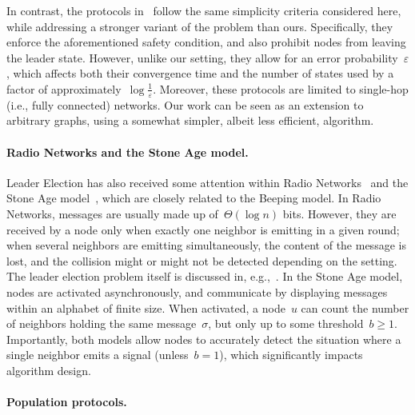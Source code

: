 \documentclass{article}
\begin{document}
In contrast, the protocols in~\cite{gilbert_computational_2015} follow the same simplicity criteria considered here, while addressing a stronger variant of the problem than ours. Specifically, they enforce the aforementioned safety condition, and also prohibit nodes from leaving the leader state. However, unlike our setting, they allow for an error probability~$\varepsilon$, which affects both their convergence time and the number of states used by a factor of approximately~$\log \frac{1}{\varepsilon}$. Moreover, these protocols are limited to single-hop (i.e., fully connected) networks.
Our work can be seen as an extension to arbitrary graphs, using a somewhat simpler, albeit less efficient, algorithm.

\paragraph{Radio Networks and the Stone Age model.} Leader Election has also received some attention within Radio Networks~\cite{chlamtac_broadcasting_1985} and the Stone Age model~\cite{emek_stone_2013}, which are closely related to the Beeping model.
In Radio Networks, messages are usually made up of~$\Theta(\log n)$ bits. However, they are received by a node only when exactly one neighbor is emitting in a given round; when several neighbors are emitting simultaneously, the content of the message is lost, and the collision might or might not be detected depending on the setting.
The leader election problem itself is discussed in, e.g.,~\cite{chlebus_electing_2012,kowalski_leader_2009}.
In the Stone Age model, nodes are activated asynchronously, and communicate by displaying messages within an alphabet of finite size. When activated, a node~$u$ can count the number of neighbors holding the same message~$\sigma$, but only up to some threshold~$b \geq 1$.
Importantly, both models allow nodes to accurately detect the situation where a single neighbor emits a signal (unless~$b=1$), which significantly impacts algorithm design.

\paragraph{Population protocols.} 
\end{document}
